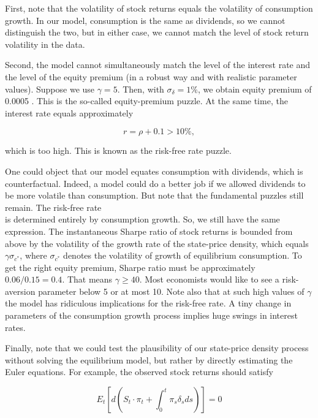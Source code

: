 \documentclass[\topdir/lecture\_notes.tex]{subfiles}
\begin{document}
First, note that the volatility of stock returns equals the volatility of consumption growth. In our model, consumption is the same as dividends, so we cannot distinguish the two, but in either case, we cannot match the level of stock return volatility in the data.

Second, the model cannot simultaneously match the level of the interest rate and the level of the equity premium (in a robust way and with realistic parameter values). Suppose we use $\gamma=5$. Then, with $\sigma_{\delta}=1 \%$, we obtain equity premium of 0.0005 . This is the so-called equity-premium puzzle. At the same time, the interest rate equals approximately

\begin{equation}
r=\rho+0.1>10 \%,
\end{equation}

which is too high. This is known as the risk-free rate puzzle.

One could object that our model equates consumption with dividends, which is counterfactual. Indeed, a model could do a better job if we allowed dividends to be more volatile than consumption. But note that the fundamental puzzles still remain. The risk-free rate\\
is determined entirely by consumption growth. So, we still have the same expression. The instantaneous Sharpe ratio of stock returns is bounded from above by the volatility of the growth rate of the state-price density, which equals $\gamma \sigma_{c^{*}}$, where $\sigma_{c^{*}}$ denotes the volatility of growth of equilibrium consumption. To get the right equity premium, Sharpe ratio must be approximately $0.06 / 0.15=0.4$. That means $\gamma \geq 40$. Most economists would like to see a risk-aversion parameter below 5 or at most 10. Note also that at such high values of $\gamma$ the model has ridiculous implications for the risk-free rate. A tiny change in parameters of the consumption growth process implies huge swings in interest rates.

Finally, note that we could test the plausibility of our state-price density process without solving the equilibrium model, but rather by directly estimating the Euler equations. For example, the observed stock returns should satisfy

\begin{equation}
E_{t}\left[d\left(S_{t} \cdot \pi_{t}+\int_{0}^{t} \pi_{s} \delta_{s} d s\right)\right]=0
\end{equation}
\end{document}

